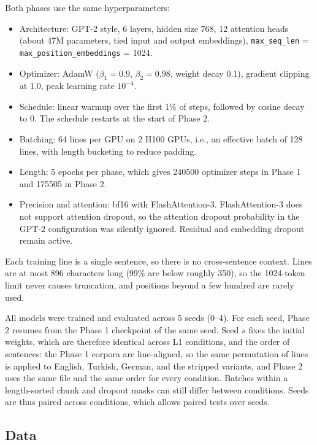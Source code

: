 \documentclass[11pt]{article}
\begin{document}
Both phases use the same hyperparameters:

\begin{itemize}
    \item Architecture: GPT-2 style, 6 layers, hidden size 768, 12 attention heads (about 47M parameters, tied input and output embeddings), \texttt{max\_seq\_len} = \texttt{max\_position\_embeddings} = 1024.
    \item Optimizer: AdamW ($\beta_1 = 0.9$, $\beta_2 = 0.98$, weight decay 0.1), gradient clipping at 1.0, peak learning rate $10^{-4}$.
    \item Schedule: linear warmup over the first 1\% of steps, followed by cosine decay to 0. The schedule restarts at the start of Phase 2.
    \item Batching: 64 lines per GPU on 2 H100 GPUs, i.e., an effective batch of 128 lines, with length bucketing to reduce padding.
    \item Length: 5 epochs per phase, which gives \num{240500} optimizer steps in Phase 1 and \num{175505} in Phase 2.
    \item Precision and attention: bf16 with FlashAttention-3. FlashAttention-3 does not support attention dropout, so the attention dropout probability in the GPT-2 configuration was silently ignored. Residual and embedding dropout remain active.
\end{itemize}

Each training line is a single sentence, so there is no cross-sentence context. Lines are at most 896 characters long (99\% are below roughly 350), so the 1024-token limit never causes truncation, and positions beyond a few hundred are rarely used.

All models were trained and evaluated across 5 seeds (0--4). For each seed, Phase 2 resumes from the Phase 1 checkpoint of the same seed. Seed $s$ fixes the initial weights, which are therefore identical across L1 conditions, and the order of sentences: the Phase 1 corpora are line-aligned, so the same permutation of lines is applied to English, Turkish, German, and the stripped variants, and Phase 2 uses the same file and the same order for every condition. Batches within a length-sorted chunk and dropout masks can still differ between conditions. Seeds are thus paired across conditions, which allows paired tests over seeds.


\subsection{Data}
\end{document}

